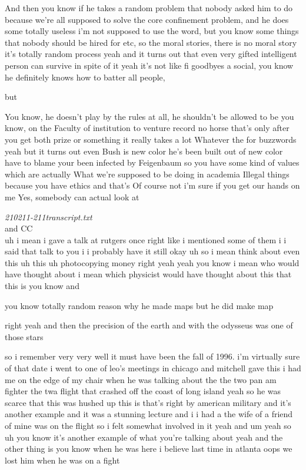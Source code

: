 \begin{description}
And then you know if he takes a random problem that nobody asked
him to do because we're all supposed to solve the core confinement
problem, and he does some totally useless i'm not supposed to use
the word, but you know some things that nobody should be hired for
etc, so the moral stories, there is no moral story it's totally
random process yeah and it turns out that even very gifted
intelligent person can survive in spite of it yeah it's not like fi
goodbyes a social, you know he definitely knows how to batter all
people,

but

You know, he doesn't play by the rules at all, he shouldn't be
allowed to be you know, on the Faculty of institution to venture
record no horse that's only after you get both prize or something
it really takes a lot Whatever the for buzzwords yeah but it turns
out even Bush is new color he's been built out of new color have to
blame your been infected by Feigenbaum so you have some kind of
values which are actually What we're supposed to be doing in
academia Illegal things because you have ethics and that's Of
course not i'm sure if you get our hands on me Yes, somebody can
actual look at

\emph{210211-211transcript.txt}\\
and
 {CC}\\

uh i mean i gave a talk at rutgers once right like i mentioned some of
them i i said that talk to you i i probably have it still okay uh so i
mean think about even this uh this uh photocopying money right yeah yeah
you know i mean who would have thought about i mean which physicist would
have thought about this that this is you know and

you know totally random
reason why he made maps but he did make map

right yeah and then the
precision of the earth and with the odysseus was one of those stars

so i remember very very well it must have been the fall of 1996. i'm
virtually sure of that date i went to one of leo's meetings in chicago
and mitchell gave this i had me on the edge of my chair when he was
talking about the the two pan am fighter the twa flight that crashed off
the coast of long island yeah so he was scarce that this was hushed up
this is that's right by american military and it's another example and it
was a stunning lecture and i i had a the wife of a friend of mine was on
the flight so i felt somewhat involved in it yeah and um yeah so uh you
know it's another example of what you're talking about yeah and the other
thing is you know when he was here i believe last time in atlanta oops we
lost him when he was on a fight


\end{description}
